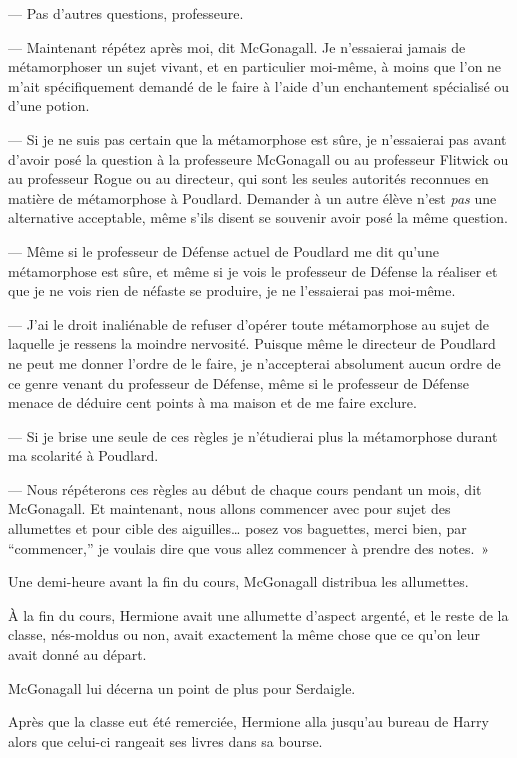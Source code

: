 --- Pas d'autres questions, professeure.

--- Maintenant répétez après moi, dit McGonagall.
Je n'essaierai jamais de métamorphoser un sujet vivant, et en particulier moi-même, à moins que l'on ne m'ait spécifiquement demandé de le faire à l'aide d'un enchantement spécialisé ou d'une potion.

--- Si je ne suis pas certain que la métamorphose est sûre, je n'essaierai pas avant d'avoir posé la question à la professeure McGonagall ou au professeur Flitwick ou au professeur Rogue ou au directeur, qui sont les seules autorités reconnues en matière de métamorphose à Poudlard.
Demander à un autre élève n'est \emph{pas} une alternative acceptable, même s'ils disent se souvenir avoir posé la même question.

--- Même si le professeur de Défense actuel de Poudlard me dit qu'une métamorphose est sûre, et même si je vois le professeur de Défense la réaliser et que je ne vois rien de néfaste se produire, je ne l'essaierai pas moi-même.

--- J'ai le droit inaliénable de refuser d'opérer toute métamorphose au sujet de laquelle je ressens la moindre nervosité.
Puisque même le directeur de Poudlard ne peut me donner l'ordre de le faire, je n'accepterai absolument aucun ordre de ce genre venant du professeur de Défense, même si le professeur de Défense menace de déduire cent points à ma maison et de me faire exclure.

--- Si je brise une seule de ces règles je n'étudierai plus la métamorphose durant ma scolarité à Poudlard.

--- Nous répéterons ces règles au début de chaque cours pendant un mois, dit McGonagall.
Et maintenant, nous allons commencer avec pour sujet des allumettes et pour cible des aiguilles… posez vos baguettes, merci bien, par “commencer,” je voulais dire que vous allez commencer à prendre des notes.~»

Une demi-heure avant la fin du cours, McGonagall distribua les allumettes.

À la fin du cours, Hermione avait une allumette d'aspect argenté, et le reste de la classe, nés-moldus ou non, avait exactement la même chose que ce qu'on leur avait donné au départ.

McGonagall lui décerna un point de plus pour Serdaigle.

\later

Après que la classe eut été remerciée, Hermione alla jusqu'au bureau de Harry alors que celui-ci rangeait ses livres dans sa bourse.

